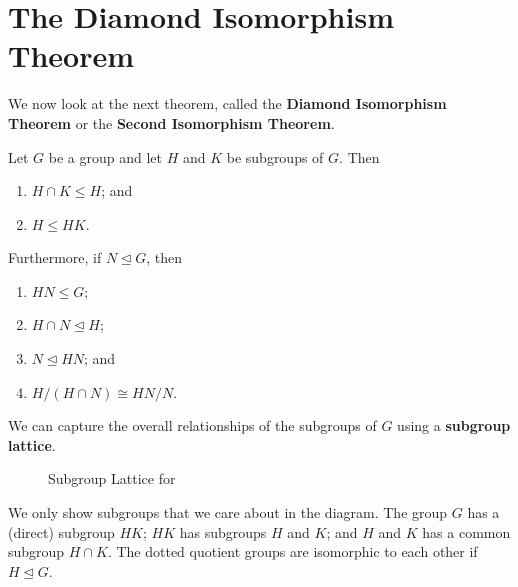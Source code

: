 \section{The Diamond Isomorphism Theorem}
We now look at the next theorem, called the \textbf{Diamond Isomorphism Theorem} or the \textbf{Second Isomorphism Theorem}.
\begin{theorem}\label{thrm-isomorphism-2}
    Let $G$ be a group and let $H$ and $K$ be subgroups of $G$. Then
    \begin{enumerate}
        \item $H \cap K \leq H$; and
        \item $H \leq HK$.
    \end{enumerate}
    Furthermore, if $N \unlhd G$, then
    \begin{enumerate}[start=3]
        \item $HN \leq G$;
        \item $H \cap N \unlhd H$;
        \item $N \unlhd HN$; and
        \item $H / (H\cap N) \cong HN / N$.
    \end{enumerate}
\end{theorem}

\newpage

We can capture the overall relationships of the subgroups of $G$ using a \textbf{subgroup lattice}.
\begin{figure}[h]
    \centering
    \caption{Subgroup Lattice for }
\end{figure}

We only show subgroups that we care about in the diagram. The group $G$ has a (direct) subgroup $HK$; $HK$ has subgroups $H$ and $K$; and $H$ and $K$ has a common subgroup $H\cap K$. The dotted quotient groups are isomorphic to each other if $H \unlhd G$.

